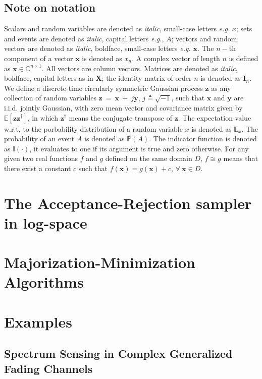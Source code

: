 \documentclass[conference, 10pt]{IEEEtran}
\begin{document}
\subsection*{Note on notation}
Scalars and random variables are denoted as \textit{italic}, small-case letters \textit{e.g.} $x$;
sets and events are denoted as \textit{italic}, capital letters \textit{e.g.}, $A$;
vectors and random vectors are denoted as \textit{italic}, boldface, small-case letters \textit{e.g.} $\bm{x}$.
The $n-$th component of a vector $\bm{x}$ is denoted as $x_n$.
A complex vector of length $n$ is defined as $\bm{x} \in \mathbb{C}^{n\times 1}$. All
vectors are column vectors. Matrices are denoted as \textit{italic}, boldface, capital
letters as in $\bm{X}$; the identity matrix of order $n$ is denoted as $\bm{I}_n$.
We define a discrete-time circularly symmetric Gaussian process $\bm{z}$ as any collection
of random variables $\bm{z}~=~\bm{x}~+~j\bm{y}$, $j \triangleq \sqrt{-1}$, such that
$\bm{x}$ and $\bm{y}$ are i.i.d. jointly Gaussian, with zero mean vector and covariance
matrix given by $\mathbb{E}\left[\bm{z}\bm{z}^{\dagger}\right]$, in which $\bm{z}^\dagger$
means the conjugate transpose of $\bm{z}$. The expectation value w.r.t. to the porbability
distribution of a random variable $x$ is denoted as $\mathbb{E}_x$. The probability of an
event $A$ is denoted as $\mathbb{P}(A)$. The indicator function is denoted as $\mathbb{I}(\cdot)$,
it evaluates to one if its argument is true and zero otherwise. For any given two real functions $f$ and $g$
defined on the same domain $D$, $f \cong g$ means that there exist a constant $c$ such that
$f(\bm{x}) = g(\bm{x}) + c$, $\forall~ \bm{x} \in D$.

\section{The Acceptance-Rejection sampler in log-space}

\section{Majorization-Minimization Algorithms}

\section{Examples}
\subsection{Spectrum Sensing in Complex Generalized Fading Channels}
\end{document}
